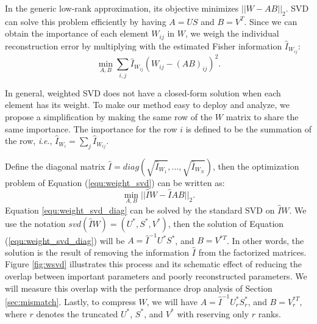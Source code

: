 \documentclass{article} %
\newcommand{\ie}{\textit{i}.\textit{e}.}
\begin{document}
In the generic low-rank approximation, its objective minimizes $||W-AB||_2$. SVD can solve this problem efficiently by having $A=US$ and $B=V^T$. Since we can obtain the importance of each element $W_{ij}$ in $W$, we weigh the individual reconstruction error by multiplying with the estimated Fisher information $\hat {I}_{W_{ij}}$:
\begin{equation}
\min\limits_{A,B} \sum\limits_{i,j} \hat {I}_{W_{ij}} (W_{ij} - (AB)_{ij})^2.
\label{equ:weight_svd}
\end{equation}

In general, weighted SVD does not have a closed-form solution \citep{srebro2003weighted} when each element has its weight. To make our method easy to deploy and analyze, we propose a simplification by making the same row of the $W$ matrix to share the same importance. The importance for the row $i$ is defined to be the summation of the row, \ie, $\hat {I}_{W_i}=\sum\limits_{j} \hat {I}_{W_{ij}}$.

Define the diagonal matrix $\hat I= diag(\sqrt{\hat I_{W_1}},...,\sqrt{\hat I_{W_N}})$, then the optimization problem of Equation (\ref{equ:weight_svd}) can be written as:
\begin{equation}
\mathop {\min }\limits_{A,B} ||\hat IW - \hat IAB|{|_2}.
\label{equ:weight_svd_diag}
\end{equation}
Equation \ref{equ:weight_svd_diag} can be solved by the standard SVD on $\hat IW$. We use the notation $svd(\hat IW)=(U^*, S^*, V^*)$, then the solution of Equation (\ref{equ:weight_svd_diag}) will be $A={\hat I}^{ - 1} U^* S^*$, and $B=V^{*T}$. In other words, the solution is the result of removing the information $\hat I$ from the factorized matrices. Figure \ref{fig:wsvd} illustrates this process and its schematic effect of reducing the overlap between important parameters and poorly reconstructed parameters. We will measure this overlap with the performance drop analysis of Section \ref{sec:mismatch}. Lastly, to compress $W$, we will have $A={\hat I}^{ - 1} U_r^* S_r^*$, and $B=V_r^{*T}$, where $r$ denotes the truncated $U^*$, $S^*$, and $V^*$ with reserving only $r$ ranks.  
\end{document}
